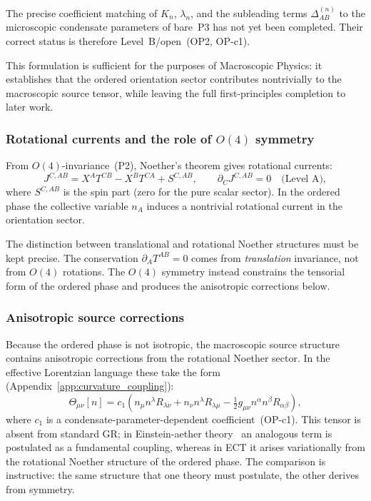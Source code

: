 The precise coefficient matching of $K_n$, $\lambda_n$, and the
subleading terms $\Delta_{AB}^{(n)}$ to the microscopic condensate
parameters of bare~P3 has not yet been completed.
Their correct status is therefore Level~B/open~(OP2, OP-c1).

This formulation is sufficient for the purposes of Macroscopic Physics:
it establishes that the ordered orientation sector contributes
nontrivially to the macroscopic source tensor, while leaving the full
first-principles completion to later work.

\subsubsection*{Rotational currents and the role of $O(4)$ symmetry}

From $O(4)$-invariance~(P2), Noether's theorem gives rotational currents:
\begin{equation}
  \label{eq:Noether_rotation}
  J^{C,AB}
  = X^A T^{CB} - X^B T^{CA} + S^{C,AB},
  \qquad
  \partial_C J^{C,AB} = 0
  \quad\text{(Level~A)},
\end{equation}
where $S^{C,AB}$ is the spin part (zero for the pure scalar sector).
In the ordered phase the collective variable $n_A$ induces a nontrivial
rotational current in the orientation sector.

The distinction between translational and rotational Noether structures
must be kept precise.
The conservation $\partial_A T^{AB}=0$ comes from \emph{translation}
invariance, not from $O(4)$ rotations.
The $O(4)$ symmetry instead constrains the tensorial form of the
ordered phase and produces the anisotropic corrections below.

\subsubsection*{Anisotropic source corrections}

Because the ordered phase is not isotropic, the macroscopic source
structure contains anisotropic corrections from the rotational Noether
sector.
In the effective Lorentzian language these take the form
(Appendix~\ref{app:curvature_coupling}):
\begin{equation}
  \label{eq:Theta_n}
  \Theta_{\mu\nu}[n]
  = c_1\!\left(
    n_\mu n^\lambda R_{\lambda\nu}
    + n_\nu n^\lambda R_{\lambda\mu}
    - \tfrac{1}{2}g_{\mu\nu}n^\alpha n^\beta R_{\alpha\beta}
  \right),
\end{equation}
where $c_1$ is a condensate-parameter-dependent coefficient~(OP-c1).
This tensor is absent from standard GR; in Einstein-aether
theory~\cite{Jacobson2004} an analogous term is postulated as a
fundamental coupling, whereas in ECT it arises variationally from
the rotational Noether structure of the ordered phase.
The comparison is instructive: the same structure that one theory must
postulate, the other derives from symmetry.

